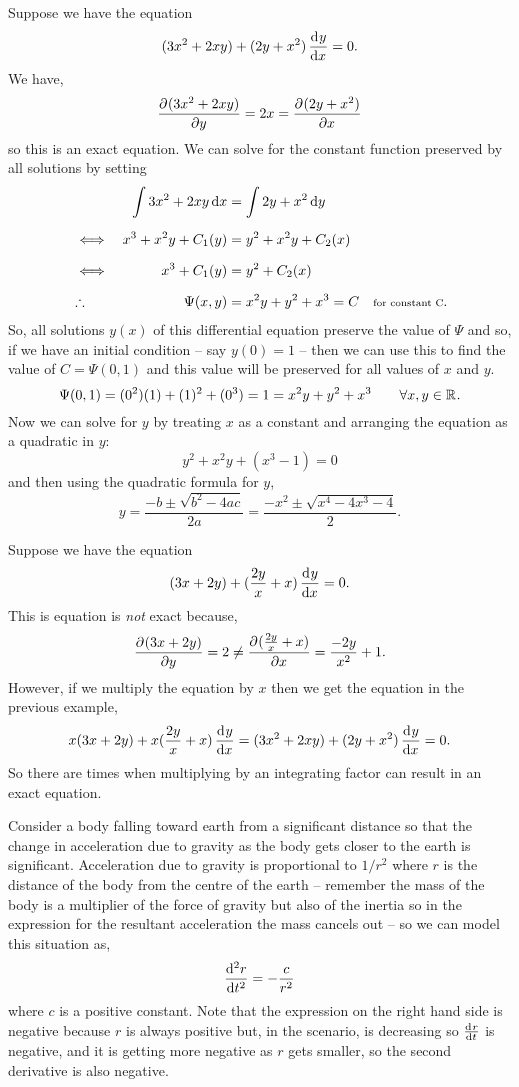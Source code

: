 \documentclass[../MathsNotesBase.tex]{subfiles}
\begin{document}
{		
		\biggerskip
		\begin{exe}
			\item{Suppose we have the equation
				\[ (3x^2 + 2xy) + (2y + x^2)\dod{y}{x} = 0. \]
				We have,
				\[ \dpd{(3x^2 + 2xy)}{y} = 2x = \dpd{(2y + x^2)}{x} \]
				so this is an exact equation. We can solve for the constant function preserved by all solutions by setting
				\begin{align*}
					&& \int 3x^2 + 2xy \dif x &= \int 2y + x^2 \dif y \nn
					&\iff & x^3 + x^2y + C_1(y) &= y^2 + x^2y + C_2(x) &\sidecomment{} \nn
					&\iff & x^3 + C_1(y) &= y^2 + C_2(x) \nn
					&\therefore & \Psi(x,y) &= x^2y + y^2 + x^3 = C  &\sidecomment{for constant C}.
				\end{align*}
				So, all solutions $y(x)$ of this differential equation preserve the value of $\Psi$ and so, if we have an initial condition -- say ${ y(0) = 1 }$ -- then we can use this to find the value of ${ C = \Psi(0,1) }$ and this value will be preserved for all values of $x$ and $y$.
				\[ \Psi(0,1) = (0^2)(1) + (1)^2 + (0^3) = 1 = x^2y + y^2 + x^3 \hspace{20pt} \forall x,y \in \mathbb{R}^{}. \]
				Now we can solve for $y$ by treating $x$ as a constant and arranging the equation as a quadratic in $y$:
				\[ y^2 + x^2 y + (x^3 - 1) = 0 \]
				and then using the quadratic formula for $y$,
				\[ y = \frac{-b \pm \sqrt{b^2 - 4ac}}{2a} = \frac{-x^2 \pm \sqrt{x^4 - 4x^3 - 4}}{2}. \]
			}
			\bigskip
			\item{Suppose we have the equation
				\[ (3x + 2y) + (\frac{2y}{x} + x)\dod{y}{x} = 0. \]
				This is equation is \textit{not} exact because,
				\[ \dpd{(3x + 2y)}{y} = 2  \neq \dpd{(\frac{2y}{x} + x)}{x} = \frac{-2y}{x^2} + 1. \]
				However, if we multiply the equation by $x$ then we get the equation in the previous example,
				\[ x(3x + 2y) + x(\frac{2y}{x} + x)\dod{y}{x} = (3x^2 + 2xy) + (2y + x^2)\dod{y}{x} = 0. \]
				So there are times when multiplying by an integrating factor can result in an exact equation.
			}
			\bigskip
			\item{
				Consider a body falling toward earth from a significant distance so that the change in acceleration due to gravity as the body gets closer to the earth is significant. Acceleration due to gravity is proportional to ${ 1/r^2 }$ where $r$ is the distance of the body from the centre of the earth -- remember the mass of the body is a multiplier of the force of gravity but also of the inertia so in the expression for the resultant acceleration the mass cancels out -- so we can model this situation as,
				\[ \dod[2]{r}{t} = -\frac{c}{r^2} \]
				where $c$ is a positive constant. Note that the expression on the right hand side is negative because $r$ is always positive but, in the scenario, is decreasing so ${ \tod{r}{t} }$ is negative, and it is getting more negative as $r$ gets smaller, so the second derivative is also negative.\\
				
}
\end{exe}}
\end{document}
